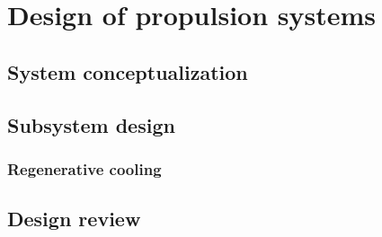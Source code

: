 \chapter{Design of propulsion systems}
\section{System conceptualization}
\section{Subsystem design}
\subsection{Regenerative cooling}

\section{Design review}
